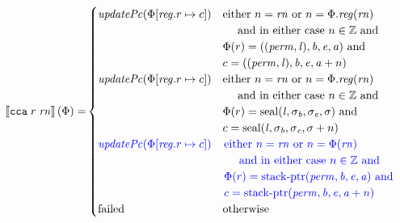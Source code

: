 \documentclass[a3paper]{article}
\newcommand{\sem}[1]{\left\llbracket #1 \right\rrbracket}
\newcommand{\tand}{\text{ and }}
\newcommand{\totherwise}{\text{otherwise }}
\newcommand{\sourcecolor}{\color{blue}}
\newcommand{\src}[1]{{\sourcecolor #1}}
\newcommand{\targetcolor}[1]{\color{black}}
\newcommand{\trg}[1]{{\targetcolor{} #1}}
\newcommand{\zinstr}[1]{\texttt{#1}}
\newcommand{\twoinstr}[3]{
  \ifthenelse{\equal{#2#3}{}}
  {\zinstr{#1}}
  {\zinstr{#1} \; #2 \; #3}
}
\newcommand{\tcca}[2]{\twoinstr{\trg{cca}}{#1}{#2}}
\newcommand{\ints}{\mathbb{Z}}
\newcommand{\update}[2]{[#1 \mapsto #2]}
\newcommand{\updReg}[2]{\update{\reg.#1}{#2}}
\newcommand{\shareddom}[1]{\mathrm{#1}}
\newcommand{\perm}{\var{perm}}
\newcommand{\lin}{\var{l}}
\newcommand{\stkptr}[1]{\mathrm{stack\text{-}ptr}(#1)}
\newcommand{\seal}[1]{\shareddom{seal}(#1)}
\newcommand{\failed}{\mathrm{failed}}
\newcommand{\var}[1]{\mathit{#1}}
\newcommand{\rn}{\var{rn}}
\newcommand{\reg}{\var{reg}}
\newcommand{\baddr}{\var{b}}
\newcommand{\eaddr}{\var{e}}
\newcommand{\aaddr}{\var{a}}
\newcommand{\plainfun}[2]{
  \ifthenelse{\equal{#2}{}}
  {\mathit{#1}}
  {\mathit{#1}(#2)}
}
\newcommand{\updPcAddr}[1]{\plainfun{updatePc}{#1}}
\begin{document}
\begin{align*}
  \sem{\tcca{r}{\rn}}(\Phi) = & 
                                  \begin{cases}
                                    \updPcAddr{\Phi\updReg{r}{c}} &  
                                    \arraycolsep=0pt
                                    \begin{array}[t]{l}
                                      \text{either $n = \rn$ or $n = \Phi.\reg(\rn)$}\\
                                      \quad\text{ and in either case $n \in \ints$ and} \\
                                      \Phi(r) = ((\perm,\lin),\baddr,\eaddr,\aaddr) \tand \\
                                      c = ((\perm,\lin),\baddr,\eaddr,\aaddr + n)
                                    \end{array}
                                    \\
                                    \updPcAddr{\Phi\updReg{r}{c}} &  
                                    \arraycolsep=0pt
                                    \begin{array}[t]{l}
                                      \text{either $n = \rn$ or $n = \Phi.\reg(\rn)$}\\
                                      \quad\text{ and in either case $n \in \ints$ and} \\
                                      \Phi(r) = \seal{\lin,\sigma_\baddr,\sigma_\eaddr,\sigma} \tand \\
                                      c = \seal{\lin,\sigma_\baddr,\sigma_\eaddr,\sigma + n}
                                    \end{array}
                                    \\
                                    \src{\updPcAddr{\Phi\updReg{r}{c}}} &  
                                    \sourcecolor\left.
                                    \arraycolsep=0pt
                                    \begin{array}[t]{l}
                                      \text{either $n = \rn$ or $n = \Phi(\rn)$}\\
                                      \quad\text{ and in either case $n \in \ints$ and} \\
                                      \Phi(r) = \stkptr{\perm,\baddr,\eaddr,\aaddr} \tand \\
                                      c = \stkptr{\perm,\baddr,\eaddr,\aaddr + n}
                                    \end{array}\right.
                                    \\
                                    \failed & \totherwise
                                  \end{cases}
\end{align*}
\end{document}
